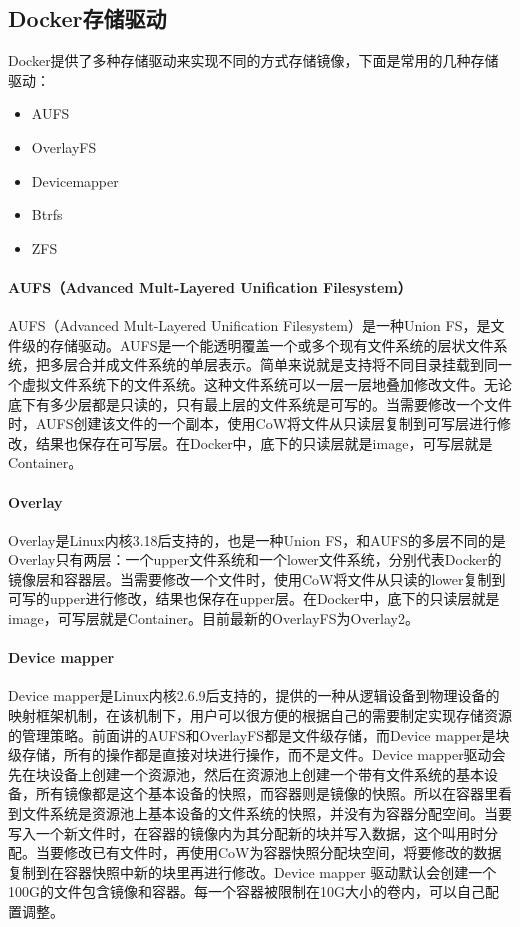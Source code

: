 \documentclass[../../../interview-questions.tex]{subfiles}
\begin{document}
\subsection{Docker存储驱动}

Docker提供了多种存储驱动来实现不同的方式存储镜像，下面是常用的几种存储驱动：

\begin{itemize}
    \item {AUFS}
    \item {OverlayFS}
    \item {Devicemapper}
    \item {Btrfs}
    \item {ZFS}
\end{itemize}

\paragraph{AUFS（Advanced Mult-Layered Unification Filesystem）}

AUFS（Advanced Mult-Layered Unification Filesystem）是一种Union FS，是文件级的存储驱动。AUFS是一个能透明覆盖一个或多个现有文件系统的层状文件系统，把多层合并成文件系统的单层表示。简单来说就是支持将不同目录挂载到同一个虚拟文件系统下的文件系统。这种文件系统可以一层一层地叠加修改文件。无论底下有多少层都是只读的，只有最上层的文件系统是可写的。当需要修改一个文件时，AUFS创建该文件的一个副本，使用CoW将文件从只读层复制到可写层进行修改，结果也保存在可写层。在Docker中，底下的只读层就是image，可写层就是Container。

\paragraph{Overlay}

Overlay是Linux内核3.18后支持的，也是一种Union FS，和AUFS的多层不同的是Overlay只有两层：一个upper文件系统和一个lower文件系统，分别代表Docker的镜像层和容器层。当需要修改一个文件时，使用CoW将文件从只读的lower复制到可写的upper进行修改，结果也保存在upper层。在Docker中，底下的只读层就是image，可写层就是Container。目前最新的OverlayFS为Overlay2。

\paragraph{Device mapper}

Device mapper是Linux内核2.6.9后支持的，提供的一种从逻辑设备到物理设备的映射框架机制，在该机制下，用户可以很方便的根据自己的需要制定实现存储资源的管理策略。前面讲的AUFS和OverlayFS都是文件级存储，而Device mapper是块级存储，所有的操作都是直接对块进行操作，而不是文件。Device mapper驱动会先在块设备上创建一个资源池，然后在资源池上创建一个带有文件系统的基本设备，所有镜像都是这个基本设备的快照，而容器则是镜像的快照。所以在容器里看到文件系统是资源池上基本设备的文件系统的快照，并没有为容器分配空间。当要写入一个新文件时，在容器的镜像内为其分配新的块并写入数据，这个叫用时分配。当要修改已有文件时，再使用CoW为容器快照分配块空间，将要修改的数据复制到在容器快照中新的块里再进行修改。Device mapper 驱动默认会创建一个100G的文件包含镜像和容器。每一个容器被限制在10G大小的卷内，可以自己配置调整。
\end{document}
